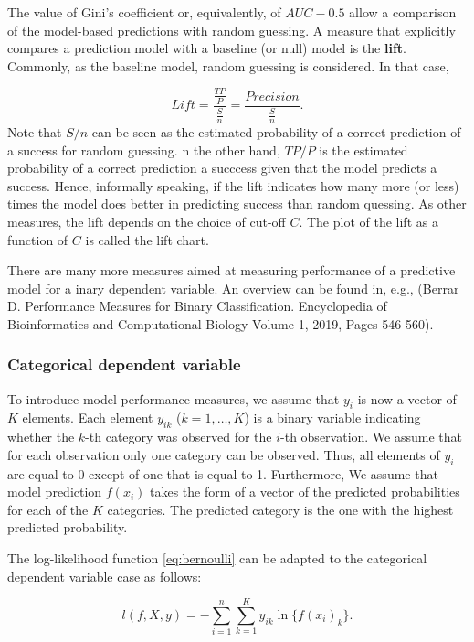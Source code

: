 \documentclass[12pt,]{krantz}
\begin{document}
The value of Gini's coefficient or, equivalently, of \(AUC-0.5\) allow a comparison of the model-based predictions with random guessing. A measure that explicitly compares a prediction model with a baseline (or null) model is the \textbf{lift}. Commonly, as the baseline model, random guessing is considered. In that case,

\[
Lift  = \frac{\frac{TP}{P}}{\frac{S}{n}} = \frac{Precision}{\frac{S}{n}}.
\]
Note that \(S/n\) can be seen as the estimated probability of a correct prediction of a success for random guessing. n the other hand, \(TP/P\) is the estimated probability of a correct prediction a succcess given that the model predicts a success. Hence, informally speaking, if the lift indicates how many more (or less) times the model does better in predicting success than random quessing. As other measures, the lift depends on the choice of cut-off \(C\). The plot of the lift as a function of \(C\) is called the lift chart.

There are many more measures aimed at measuring performance of a predictive model for a inary dependent variable. An overview can be found in, e.g., (Berrar D. Performance Measures for Binary Classification. Encyclopedia of Bioinformatics and Computational Biology Volume 1, 2019, Pages 546-560).

\hypertarget{modelPerformanceMethodCateg}{%
\subsubsection{Categorical dependent variable}\label{modelPerformanceMethodCateg}}

To introduce model performance measures, we assume that \(y_i\) is now a vector of \(K\) elements. Each element \(y_{ik}\) (\(k=1,\ldots,K\)) is a binary variable indicating whether the \(k\)-th category was observed for the \(i\)-th observation. We assume that for each observation only one category can be observed. Thus, all elements of \(y_i\) are equal to 0 except of one that is equal to 1. Furthermore, We assume that model prediction \(f(x_i)\) takes the form of a vector of the predicted probabilities for each of the \(K\) categories. The predicted category is the one with the highest predicted probability.

The log-likelihood function \eqref{eq:bernoulli} can be adapted to the categorical dependent variable case as follows:

\begin{equation}
l(f, X ,y) =  -\sum_{i=1}^{n}\sum_{k=1}^{K} y_{ik} \ln\{f(x_i)_k\}.
\label{eq:multinom}
\end{equation}
\end{document}
